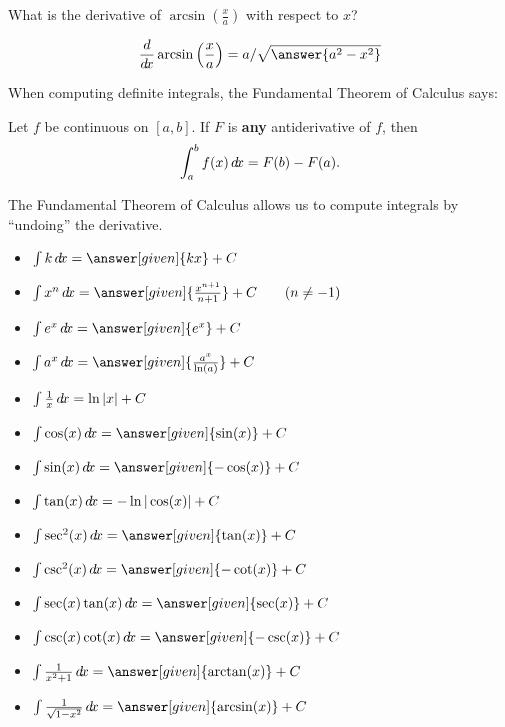 \documentclass{ximera}
\begin{document}
\begin{question} 
  What is the derivative of $\arcsin\left(\frac{x}{a}\right)$ with respect to $x$?
  \begin{prompt} 
    \[
    \ddx \arcsin\left(\frac{x}{a}\right) = a/\sqrt{\answer{a^2 - x^2}}
    \]
  \end{prompt}
\end{question}

When computing definite integrals, the Fundamental Theorem of Calculus
says:

\begin{theorem}
  Let $f$ be continuous on $[a,b]$. If $F$ is \textbf{any}
  antiderivative of $f$, then
  \[
  \int_a^b f(x)\mathop{}\!d\! x = F(b)-F(a).
  \]
\end{theorem}

The Fundamental Theorem of Calculus allows us to compute
integrals by ``undoing'' the derivative.

\begin{theorem}\hfil
\begin{itemize}
\item $\int k \d x= \answer[given]{k x}+C$
\item $\int x^n \d x= \answer[given]{\frac{x^{n+1}}{n+1}}+C\qquad(n\ne-1)$
\item $\int e^x \d x= \answer[given]{e^x} + C$
\item $\int a^x \d x= \answer[given]{\frac{a^x}{\ln(a)}}+C$
\item $\int \frac{1}{x} \mathop{}\!d\! x= \ln|x|+C$
\item $\int \cos(x) \d x = \answer[given]{\sin(x)} + C$
\item $\int \sin(x) \d x = \answer[given]{-\cos(x)} + C$  
\item $\int \tan(x) \mathop{}\!d\! x = -\ln|\cos(x)| + C$
\item $\int \sec^2(x) \d x = \answer[given]{\tan(x)} + C$
\item $\int \csc^2(x) \d x = \answer[given]{-\cot(x)} + C$
\item $\int \sec(x)\tan(x) \d x = \answer[given]{\sec(x)} + C$
\item $\int \csc(x)\cot(x) \d x = \answer[given]{-\csc(x)} + C$
\item $\int \frac{1}{x^2+1}\d x = \answer[given]{\arctan(x)} + C$
\item $\int \frac{1}{\sqrt{1-x^2}}\d x= \answer[given]{\arcsin(x)}+C$
\end{itemize}
\end{theorem}
\end{document}
